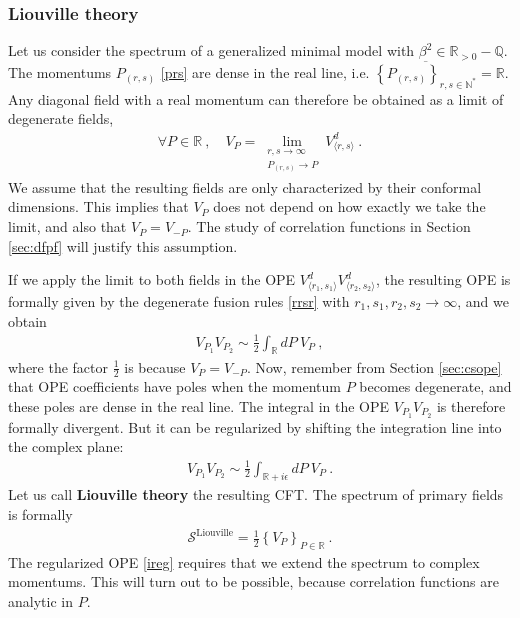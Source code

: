\documentclass[12pt, a4paper]{article}
\theoremstyle{break}
\begin{document}
\subsubsection{Liouville theory}\label{sec:liou}

Let us consider the spectrum of a generalized minimal model with $\beta^2\in\mathbb{R}_{>0}-\mathbb{Q}$. The momentums $P_{(r,s)}$ \eqref{prs} are dense in the real line, i.e. $\overline{\left\{ P_{(r,s)}\right\}_{r,s\in\mathbb{N}^*}} = \mathbb{R}$. Any diagonal field with a real momentum can therefore be obtained as a limit of degenerate fields,
\begin{align}
 \forall P\in\mathbb{R}\ , \quad V_P = \lim_{\substack{r,s\to\infty \\ P_{(r,s)}\to P}} V^d_{\langle r,s\rangle}\ .
 \label{vplim}
\end{align}
We assume that the resulting fields are only characterized by their conformal dimensions. This implies that $V_P$ does not depend on how exactly we take the limit, and also that $V_P=V_{-P}$. The study of correlation functions in Section \ref{sec:dfpf} will justify this assumption.

If we apply the limit to both fields in the OPE $V^d_{\langle r_1,s_1\rangle}V^d_{\langle r_2,s_2\rangle}$, the resulting OPE is formally given by the degenerate fusion rules \eqref{rrsr} with $r_1,s_1,r_2,s_2\to\infty$, and we obtain
\begin{align}
 \boxed{V_{P_1}V_{P_2} \sim \frac12 \int_\mathbb{R} dP\ V_P} \ ,
 \label{idpv}
\end{align}
where the factor $\frac12$ is because $V_P=V_{-P}$. Now, remember from Section \ref{sec:csope} that OPE coefficients have poles when the momentum $P$ becomes degenerate, and these poles are dense in the real line. The integral in the OPE $V_{P_1}V_{P_2}$ is therefore formally divergent. But it can be regularized by shifting the integration line into the complex plane:
\begin{align}
 V_{P_1}V_{P_2} \sim \frac12 \int_{\mathbb{R}+i\epsilon} dP\ V_P\ .
 \label{ireg}
\end{align}
Let us call \textbf{Liouville theory} the resulting CFT. The spectrum of primary fields is formally
\begin{align}
 \boxed{\mathcal{S}^\text{Liouville} = \frac12 \left\{ V_P\right\}_{P\in \mathbb{R}}}\ .
 \label{sliou}
\end{align}
The regularized OPE \eqref{ireg} requires that we extend the spectrum to complex momentums. This will turn out to be possible, because correlation functions are analytic in $P$. 
\end{document}

